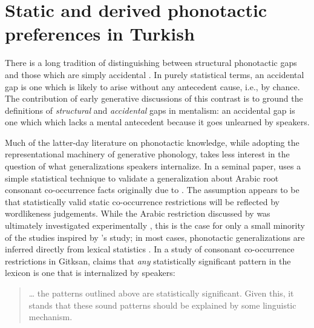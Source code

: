 \chapter{Static and derived phonotactic preferences in Turkish}
\label{turkish}

There is a long tradition of distinguishing between structural phonotactic gaps and those which are simply accidental \citep[e.g.,][]{Fischer-Jorgensen1952,Saporta1955,Saporta1958,Vogt1954}. In purely statistical terms, an accidental gap is one which is likely to arise without any antecedent cause, i.e., by chance. The contribution of early generative discussions of this contrast \citep[e.g.,][]{Halle1962,Chomsky1965,SPE} is to ground the definitions of \emph{structural} and \emph{accidental} gaps in mentalism: an accidental gap is one which which lacks a mental antecedent because it goes unlearned by speakers.

Much of the latter-day literature on phonotactic knowledge, while adopting the representational machinery of generative phonology, takes less interest in the question of what generalizations speakers internalize. In a seminal paper, \citet{McCarthy1988} uses a simple statistical technique to validate a generalization about Arabic root consonant co-occurrence facts originally due to \citet{Greenberg1950}. The assumption appears to be that statistically valid static co-occurrence restrictions will be reflected by wordlikeness judgements. While the Arabic restriction discussed by \citeauthor{McCarthy1988} was ultimately investigated experimentally \citep{Frisch2004}, this is the case for only a small minority of the studies inspired by \citeauthor{McCarthy1988}'s study; in most cases, phonotactic generalizations are inferred directly from lexical statistics \citep[e.g.,][]{Anttila2008a,Berkley1994b,Berkley1994a,Berkley2000,Brown2010,Buckley1997,Coetzee2008a,Elmedlaoui1995,Graff2011,MacEachern1999,Kinney2005,Kawahara2006,Martin2007,Martin2011,Mester1988,Miller-Ockhuizen2003,Padgett1992,Padgett1995,Pozdniakov2007,Yip1989}. In a study of consonant co-occurrence restrictions in Gitksan, \citet{Brown2010} claims that \emph{any} statistically significant pattern in the lexicon is one that is internalized by speakers:

\begin{quote}
\ldots{} the patterns outlined above are statistically significant. Given this, it stands that these sound patterns should be explained by some linguistic mechanism. \citep[][48]{Brown2010}
\end{quote}

